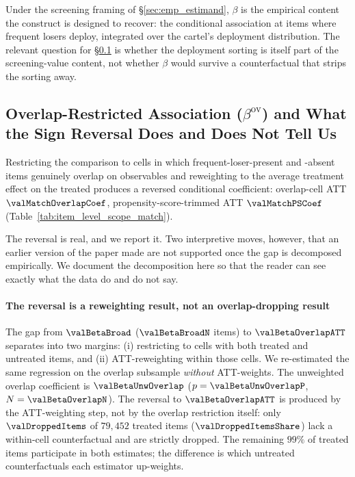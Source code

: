 Under the screening framing of §\ref{sec:emp_estimand}, $\beta$
is the empirical content the construct is designed to recover:
the conditional association at items where frequent losers
deploy, integrated over the cartel's deployment distribution.
The relevant question for §\ref{sec:results_overlap} is whether
the deployment sorting is itself part of the screening-value
content, not whether $\beta$ would survive a counterfactual
that strips the sorting away.

\subsection{Overlap-Restricted Association \texorpdfstring{($\beta^{\text{ov}}$)}{(beta-ov)} and What the Sign Reversal Does and Does Not Tell Us}
\label{sec:results_overlap}

Restricting the comparison to cells in which frequent-loser-present
and -absent items genuinely overlap on observables and reweighting
to the average treatment effect on the treated produces a reversed
conditional coefficient: overlap-cell ATT $\valMatchOverlapCoef$,
propensity-score-trimmed ATT $\valMatchPSCoef$
(Table~\ref{tab:item_level_scope_match}).



The reversal is real, and we report it. Two interpretive moves,
however, that an earlier version of the paper made are not
supported once the gap is decomposed empirically. We document the
decomposition here so that the reader can see exactly what the
data do and do not say.

\paragraph{The reversal is a reweighting result, not an
overlap-dropping result} The gap from $\valBetaBroad$
($\valBetaBroadN$ items) to $\valBetaOverlapATT$ separates into
two margins: (i) restricting to cells with both treated and
untreated items, and (ii) ATT-reweighting within those cells.
We re-estimated the same regression on the overlap subsample
\emph{without} ATT-weights. The unweighted overlap coefficient is
$\valBetaUnwOverlap$ ($p=\valBetaUnwOverlapP$,
$N=\valBetaOverlapN$). The reversal to $\valBetaOverlapATT$ is
produced by the ATT-weighting step, not by the overlap restriction
itself: only $\valDroppedItems$ of $79{,}452$ treated items
($\valDroppedItemsShare$) lack a within-cell counterfactual and
are strictly dropped. The remaining $99\%$ of treated items
participate in both estimates; the difference is which untreated
counterfactuals each estimator up-weights.

